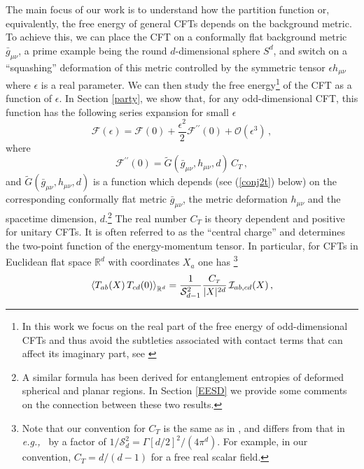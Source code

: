 \documentclass[12pt]{article}
\numberwithin{equation}{section}
\newcommand{\req}[1]{(\ref{#1})} %
\newcommand{\ssc}{\scriptscriptstyle}
\newcommand{\eg}{{\it e.g.,}\ }
\newcommand{\ctt}{C_{\ssc T}}
\begin{document}
The main focus of our work is to understand how the partition function or, equivalently, the free energy of general CFTs depends on the background metric. To achieve this, we can place the CFT on a conformally flat background metric $\bar{g}_{\mu\nu}$, a prime example being the round $d$-dimensional sphere $S^d$, and switch on a ``squashing'' deformation of this metric controlled by the symmetric tensor $\epsilon h_{\mu\nu}$ where $\epsilon$ is a real parameter. We can then study the free energy\footnote{In this work we focus on the real part of the free energy of odd-dimensional CFTs and thus avoid the subtleties associated with contact terms that can affect its imaginary part, see \cite{Closset:2012vg,Closset:2012vp}} of the CFT as a function of $\epsilon$. In Section \ref{party}, we show that, for any odd-dimensional CFT, this function has the following series expansion for small $\epsilon$
%
\begin{equation}\label{Fintro}
\mathcal{F}(\epsilon)=\mathcal{F}(0)+\frac{\epsilon^2}{2}\mathcal{F}^{\prime\prime}(0)+\mathcal{O}(\epsilon^3)\, ,
\end{equation}
%
where
%
\begin{equation}\label{F2primeintro}
\mathcal{F}^{\prime\prime}(0)=\tilde{G}(\bar{g}_{\mu\nu},h_{\mu\nu},d)\, \ctt  \, ,
\end{equation}
%
and $\tilde{G}(\bar{g}_{\mu\nu},h_{\mu\nu},d)$ is a function which depends (see \req{conj2t} below) on the corresponding conformally flat metric $\bar{g}_{\mu\nu}$, the metric deformation $h_{\mu\nu}$ and the spacetime dimension, $d$.\footnote{A similar formula has been derived for entanglement entropies of deformed spherical and planar regions. In Section \ref{EESD} we provide some comments on the connection between these two results.} The real number $\ctt$ is theory dependent and positive for unitary CFTs. It is often referred to as the ``central charge'' and determines the two-point function of the energy-momentum tensor. In particular, for CFTs in Euclidean flat space $\mathbb{R}^d$ with coordinates $X_a$ one has \cite{Osborn}\footnote{\label{foo}Note that our convention for $\ctt$ is the same as in \cite{Bobev:2015jxa}, and differs from that in \eg \cite{Osborn,Buchel:2009sk} by a factor of $1/\mathcal{S}_d^2=\Gamma[d/2]^2/(4\pi^d)$. For example, in our convention, $\ctt=d/(d-1)$ for a free real scalar field.}
%
\begin{align} \label{t2p}
\braket{ T_{ab} (X)\, T_{cd}(0) }_{\mathbb{R}^d}=\frac{1}{\mathcal{S}^2_{d-1}}\frac{\ctt}{|X|^{2d}}\,\mathcal{I}_{ab,cd}(X)\, ,
\end{align} 
\end{document}
